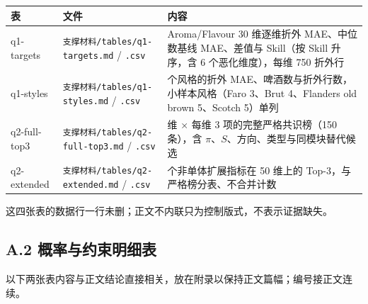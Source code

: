 \documentclass[11pt,a4paper]{article}
\begin{document}
{
\begin{longtable}[]{@{}
  >{\raggedright\arraybackslash}p{}
  >{\raggedright\arraybackslash}p{}
  >{\raggedright\arraybackslash}p{}@{}}
\toprule\noalign{}
\begin{minipage}[b]{\linewidth}\raggedright
表
\end{minipage} & \begin{minipage}[b]{\linewidth}\raggedright
文件
\end{minipage} & \begin{minipage}[b]{\linewidth}\raggedright
内容
\end{minipage} \\
\midrule\noalign{}
\endhead
\bottomrule\noalign{}
\endlastfoot
q1-targets & \texttt{支撑材料/\allowbreak{}tables/\allowbreak{}q1-\allowbreak{}targets.md} / \texttt{.csv} &
Aroma/Flavour 30 维逐维折外 MAE、中位数基线 MAE、差值与 Skill（按 Skill
升序，含 6 个恶化维度），每维 750 折外行 \\
q1-styles & \texttt{支撑材料/\allowbreak{}tables/\allowbreak{}q1-\allowbreak{}styles.md} / \texttt{.csv} & 22
个风格的折外 MAE、啤酒数与折外行数，小样本风格（Faro 3、Brut 4、Flanders
old brown 5、Scotch 5）单列 \\
q2-full-top3 & \texttt{支撑材料/\allowbreak{}tables/\allowbreak{}q2-\allowbreak{}full-\allowbreak{}top3.md} / \texttt{.csv}
& 50 维 × 每维 3 项的完整严格共识榜（150 条），含
\(\pi\)、\(S\)、方向、类型与同模块替代候选 \\
q2-extended & \texttt{支撑材料/\allowbreak{}tables/\allowbreak{}q2-\allowbreak{}extended.md} / \texttt{.csv} &
15 个非单体扩展指标在 50 维上的 Top-3，与严格榜分表、不合并计数 \\
\end{longtable}
}

这四张表的数据行一行未删；正文不内联只为控制版式，不表示证据缺失。

\subsection*{A.2
概率与约束明细表}\label{a.2-ux6982ux7387ux4e0eux7ea6ux675fux660eux7ec6ux8868}

以下两张表内容与正文结论直接相关，放在附录以保持正文篇幅；编号接正文连续。
\end{document}
